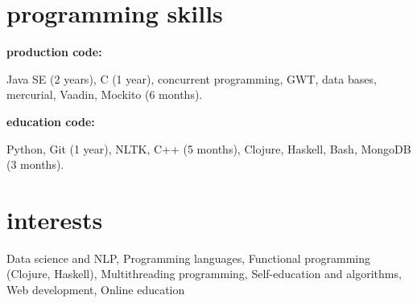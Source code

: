 \documentclass[]{friggeri-cv} %
\begin{document}
%

\section{programming skills}
\textbf{production code:}

Java SE (2 years), C (1 year), concurrent programming, GWT,
data bases, mercurial, Vaadin, Mockito (6 months).

\textbf{education code:}

Python, Git (1 year), NLTK, C++ (5 months), Clojure, Haskell, Bash, MongoDB (3 months).

\section{interests}

Data science and NLP, Programming languages, Functional programming (Clojure, Haskell), Multithreading programming,
  Self-education and algorithms, Web development, Online education


\end{document}
